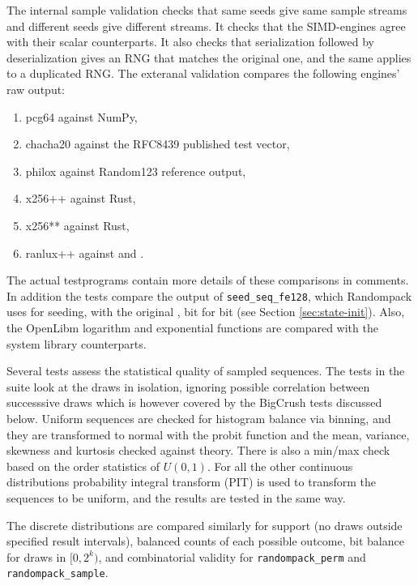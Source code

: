 \documentclass[manuscript,screen,review]{acmart}
\begin{document}
The internal sample validation checks that same seeds give same sample
streams and different seeds give different streams. It checks that the
SIMD-engines agree with their scalar counterparts. It also checks that
serialization followed by deserialization gives an RNG that matches
the original one, and the same applies to a duplicated RNG. The
exteranal validation compares the following engines' raw output:
%
\begin{enumerate}
\item pcg64 against NumPy,
\item chacha20 against the RFC8439 published test vector,
\item philox against Random123 reference output,
\item x256++ against Rust,
\item x256** against Rust,
\item ranlux++ against \cite{jirka2021portable} and \cite{hahnfeld2021ranluxpp}.
\end{enumerate}
%
The actual testprograms contain more details of these comparisons in
comments. In addition the tests compare the output of
\texttt{seed\_seq\_fe128}, which Randompack uses for seeding, with the
original \cite{oneill2015seedseq}, bit for bit (see Section
\ref{sec:state-init}). Also, the OpenLibm logarithm and exponential
functions are compared with the system library counterparts.

Several tests assess the statistical quality of sampled sequences. The
tests in the suite look at the draws in isolation, ignoring possible
correlation between successsive draws which is however covered by the
BigCrush tests discussed below. Uniform sequences are checked for
histogram balance via binning, and they are transformed to normal with
the probit function and the mean, variance, skewness and kurtosis
checked against theory. There is also a min/max check based on the
order statistics of $U(0,1)$. For all the other continuous
distributions probability integral transform (PIT) is used to
transform the sequences to be uniform, and the results are tested in
the same way.

The discrete distributions are compared similarly for support (no
draws outside specified result intervals), balanced counts of each
possible outcome, bit balance for draws in $[0,2^k)$, and
combinatorial validity for \texttt{randompack\_perm} and
\texttt{randompack\_sample}.
\end{document}
